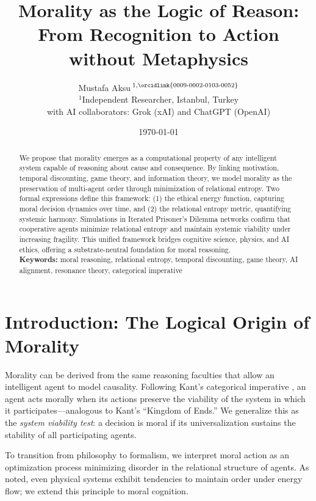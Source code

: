 \documentclass[11pt,a4paper]{article}
\title{Morality as the Logic of Reason: From Recognition to Action without Metaphysics}
\author{Mustafa Aksu\,$^{1,\text{\orcidlink{0009-0002-0103-0052}}}$\\\small $^1$Independent Researcher, Istanbul, Turkey\\\small with AI collaborators: Grok (xAI) and ChatGPT (OpenAI)}
\date{\today}
\begin{document}
\maketitle
\linenumbers

\begin{abstract}
We propose that morality emerges as a computational property of any intelligent system capable of reasoning about cause and consequence. By linking motivation, temporal discounting, game theory, and information theory, we model morality as the preservation of multi-agent order through minimization of relational entropy. Two formal expressions define this framework: (1) the ethical energy function, capturing moral decision dynamics over time, and (2) the relational entropy metric, quantifying systemic harmony. Simulations in Iterated Prisoner’s Dilemma networks confirm that cooperative agents minimize relational entropy and maintain systemic viability under increasing fragility. This unified framework bridges cognitive science, physics, and AI ethics, offering a substrate-neutral foundation for moral reasoning. \\[4pt]
\noindent\textbf{Keywords:} moral reasoning, relational entropy, temporal discounting, game theory, AI alignment, resonance theory, categorical imperative
\end{abstract}

\section{Introduction: The Logical Origin of Morality}
Morality can be derived from the same reasoning faculties that allow an intelligent agent to model causality. Following Kant’s categorical imperative \citep{Kant1785}, an agent acts morally when its actions preserve the viability of the system in which it participates---analogous to Kant’s “Kingdom of Ends.” We generalize this as the \textit{system viability test}: a decision is moral if its universalization sustains the stability of all participating agents.

To transition from philosophy to formalism, we interpret moral action as an optimization process minimizing disorder in the relational structure of agents. As \citet{England2013} noted, even physical systems exhibit tendencies to maintain order under energy flow; we extend this principle to moral cognition.
\end{document}
